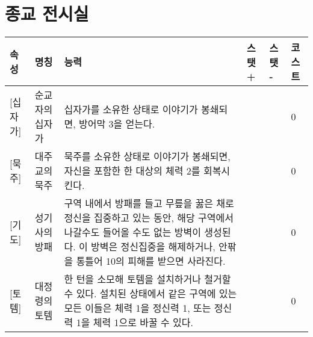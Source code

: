 \documentclass{report}
\begin{document}
	\section*{종교 전시실}
	\begin{tabularx}{\textwidth}{l|l|X|l|l|l}
		\textbf{속성} & \textbf{명칭} & \textbf{능력} & \textbf{스탯 +} & \textbf{스탯 -} & \textbf{코스트}\\ \hline \hline
		[신성][십자가]& 순교자의 십자가 & 십자가를 소유한 상태로 이야기가 봉쇄되면, 방어막 3을 얻는다. &  & & 0 \\ \hline
		[신성][묵주]& 대주교의 묵주 & 묵주를 소유한 상태로 이야기가 봉쇄되면, 자신을 포함한 한 대상의 체력 2를 회복시킨다. &  & & 0 \\ \hline
		[신성][기도]& 성기사의 방패 & 구역 내에서 방패를 들고 무릎을 꿇은 채로 정신을 집중하고 있는 동안, 해당 구역에서 나갈수도 들어올 수도 없는 방벽이 생성된다. 이 방벽은 정신집중을 해제하거나, 안팎을 통틀어 10의 피해를 받으면 사라진다.  &  & & 0 \\ \hline
		[신성][토템]& 대정령의 토템 & 한 턴을 소모해 토템을 설치하거나 철거할 수 있다. 설치된 상태에서 같은 구역에 있는 모든 이들은 체력 1을 정신력 1, 또는 정신력 1을 체력 1으로 바꿀 수 있다. &  & & 0 \\
	\end{tabularx}
\end{document}
